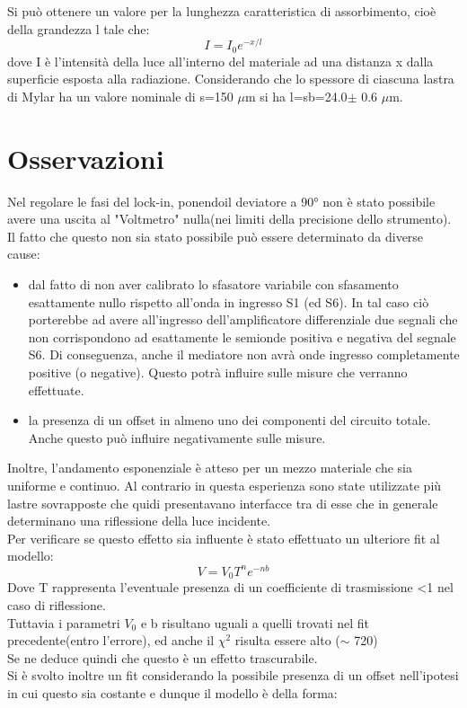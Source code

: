 Si può ottenere un valore per la lunghezza caratteristica di assorbimento, cioè della grandezza l tale che:
\begin{equation}
I=I_{0}e^{-x/l}
\end{equation}
dove I è l'intensità della luce all'interno del materiale ad una distanza x dalla superficie esposta alla radiazione.
Considerando che lo spessore di ciascuna lastra di Mylar ha un valore nominale di s=150 $\mu$m si ha l=sb=24.0$ \pm$ 0.6 $\mu$m.

\section{Osservazioni}
Nel regolare le fasi del lock-in, ponendoil deviatore a 90° non è stato possibile avere una uscita al "Voltmetro" nulla(nei limiti della precisione dello strumento).\\
Il fatto che questo non sia stato possibile può essere determinato da diverse cause:
\begin{itemize}
\item dal fatto di non aver calibrato lo sfasatore variabile con sfasamento esattamente nullo rispetto all'onda in ingresso S1 (ed S6).
In tal caso ciò porterebbe ad avere all'ingresso dell'amplificatore differenziale due segnali che non corrispondono ad esattamente le semionde positiva e negativa del segnale S6. Di conseguenza, anche il mediatore non avrà onde ingresso completamente positive (o negative). Questo potrà influire sulle misure che verranno effettuate.\\
\item la presenza di un offset in almeno uno dei componenti del circuito totale. Anche questo può influire negativamente sulle misure.
\end{itemize} 
Inoltre, l'andamento esponenziale è atteso per un mezzo materiale che sia uniforme e continuo. Al contrario in questa esperienza sono state utilizzate più lastre sovrapposte che quidi presentavano interfacce tra di esse che in generale determinano una riflessione della luce incidente.\\
Per verificare se questo effetto sia influente è stato effettuato un ulteriore fit al modello:
\begin{equation}
V=V_{0}T^{n}e^{-nb}
\end{equation}
Dove T rappresenta l'eventuale presenza di un coefficiente di trasmissione <1 nel caso di riflessione.\\
Tuttavia i parametri $V_{0}$ e b risultano uguali a quelli trovati nel fit precedente(entro l'errore), ed anche il $\chi^{2}$ risulta essere alto ($\sim$ 720)\\
Se ne deduce quindi che questo è un effetto trascurabile.\\
Si è svolto inoltre un fit considerando la possibile presenza di un offset nell'ipotesi in cui questo sia costante e dunque il modello è della forma:

